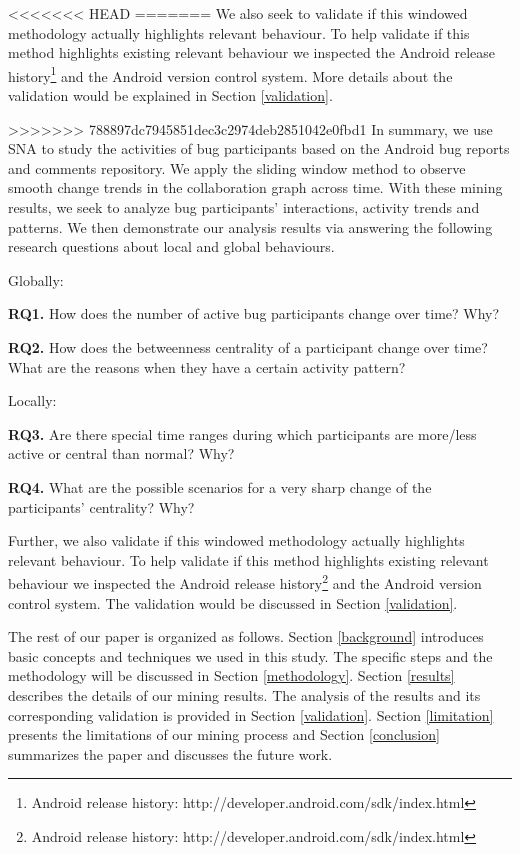 \documentclass[conference]{IEEEtran}
\begin{document}
<<<<<<< HEAD
=======
We also seek to validate if this windowed methodology actually
highlights relevant behaviour.
To help validate if this method highlights existing relevant behaviour 
we inspected the Android release
history\footnote[1]{Android release history:
  http://developer.android.com/sdk/index.html} and the Android version
control system.
More details about the validation would be explained in Section
\ref{validation}.
 

>>>>>>> 788897dc7945851dec3c2974deb2851042e0fbd1
In summary, we use SNA to study the activities of bug
participants based on the Android bug reports and comments
repository. 
We apply the sliding window method to observe smooth change trends
in the collaboration graph across time.
With these mining results, we seek to analyze bug participants'
interactions, activity trends and patterns. 
We then demonstrate our analysis results via answering the following
research questions about local and global behaviours.


Globally:

\textbf{RQ1.} How does the number of active bug participants change over
  time? Why?

\textbf{RQ2.} How does the betweenness centrality of a participant change over
time? What are the reasons when they have a certain activity pattern?

Locally:

\textbf{RQ3.} Are there special time ranges during which participants are more/less
active or central than normal? Why?

\textbf{RQ4.} What are the possible scenarios for a very sharp change of the
participants' centrality? Why?

Further, we also validate if this windowed methodology actually
highlights relevant behaviour.
To help validate if this method highlights existing relevant behaviour 
we inspected the Android release
history\footnote[1]{Android release history:
  http://developer.android.com/sdk/index.html} and the Android version
control system.
The validation would be discussed in Section
\ref{validation}.
 

% 
The rest of our paper is organized as follows. 
Section \ref{background} introduces basic concepts and techniques we
used in this study. 
The specific steps and the methodology will be discussed in Section
\ref{methodology}. 
Section \ref{results} describes the details of our mining results. 
The analysis of the results and its corresponding validation is
provided in Section \ref{validation}. 
Section \ref{limitation} presents the limitations of our mining
process and Section \ref{conclusion} summarizes the paper and
discusses the future work.
\end{document}
